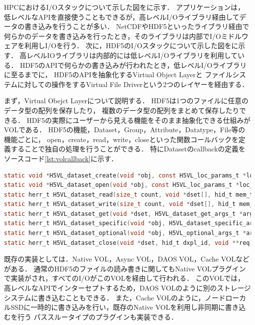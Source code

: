 \documentclass[submit,techrep,noauthor]{ipsj}
\newcommand{\lstref}[1]{ソースコード\ref{#1}}
\begin{document}
HPCにおけるI/Oスタックについて示した図をに示す．
アプリケーションは，低レベルなAPIを直接使うこともできるが，高レベルI/Oライブラリ経由してデータの書き込みを行うことが多い．
NetCDFやHDF5といったライブラリ経由で何らかのデータを書き込みを行ったとき，そのライブラリは内部でI/Oミドルウェアを利用しI/Oを行う．
次に，HDF5のI/Oスタックについて示した図をに示す．
高レベルIOライブラリは内部的には低レベルI/Oライブラリを利用している．
HDF5のAPIで何らかの書き込みが行われたとき，低レベルI/Oライブラリに至るまでに，
HDF5のAPIを抽象化するVirtual Object Layerと
ファイルシステムに対しての操作をするVirtual File Driverという2つのレイヤーを経由する．

まず，Virtual Obejct Layerについて説明する．
HDF5は1つのファイルに任意のデータ型の配列を保存したり，
複数のデータ型の配列をまとめて保存したりできる．
HDF5の実際にユーザーから見える機能をそのまま抽象化できる仕組みがVOLである．
HDF5の機能，Dataset，Group，Attribute，Datatype，File等の機能ごとに，
open，create，read，write，closeといった関数コールバックを定義することで独自の処理を行うことができる．
特にDatasetのcallbackの定義を\lstref{lst:volcallback}に示す．
\begin{lstlisting}[caption=VOLのDataset Callbackの定義,label=lst:volcallback,language=c]
static void *H5VL_dataset_create(void *obj, const H5VL_loc_params_t *loc_params, const char *name, hid_t lcpl_id, hid_t type_id, hid_t space_id, hid_t dcpl_id, hid_t dapl_id, hid_t dxpl_id, void **req);
static void *H5VL_dataset_open(void *obj, const H5VL_loc_params_t *loc_params, const char *name, hid_t dapl_id, hid_t dxpl_id, void **req);
static herr_t H5VL_dataset_read(size_t count, void *dset[], hid_t mem_type_id[], hid_t mem_space_id[], hid_t file_space_id[], hid_t plist_id, void *buf[], void **req);
static herr_t H5VL_dataset_write(size_t count, void *dset[], hid_t mem_type_id[], hid_t mem_space_id[], hid_t file_space_id[], hid_t plist_id, const void *buf[], void **req);
static herr_t H5VL_dataset_get(void *dset, H5VL_dataset_get_args_t *args, hid_t dxpl_id, void **req);
static herr_t H5VL_dataset_specific(void *obj, H5VL_dataset_specific_args_t *args, hid_t dxpl_id, void **req);
static herr_t H5VL_dataset_optional(void *obj, H5VL_optional_args_t *args, hid_t dxpl_id, void **req);
static herr_t H5VL_dataset_close(void *dset, hid_t dxpl_id, void **req);
\end{lstlisting}
既存の実装としては．Native VOL，Async VOL，DAOS VOL，Cache VOLなどがある．
通常のHDF5のファイルの読み書きに関してもNative VOLプラグインで実装がされ，すべてのI/OがこのVOLを経由して行われる．
このVOLでは，高レベルなAPIでインターセプトするため，DAOS VOLのように別のストレージシステムに書き込むこともできる．
また，Cache VOLのように，ノードローカルSSDに一時的に書き込みを行い，既存のNative VOLを利用し非同期に書き込むを行う
パススルータイプのプラグインも実装できる．
\end{document}
